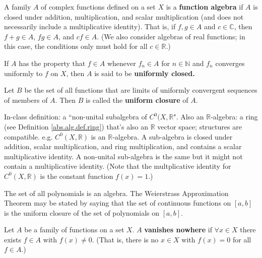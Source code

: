 \begin{definition}

A family \(A\) of complex functions defined on a set \(X\) is a \textbf{function algebra} if \(A\) is closed under addition, multiplication, and scalar multiplication (and does not necessarily include a multiplicative identity). That is, if \(f, g \in A\) and \(c \in \mathbb{C}\), then \(f + g \in A\), \(fg \in A\), and \(cf \in A\). (We also consider algebras of real functions; in this case, the conditions only must hold for all \(c \in \mathbb{R}\).)

If \(A\) has the property that \(f \in A\) whenever \(f_n \in A\) for \(n \in \mathbb{N}\) and \(f_n\) converges uniformly to \(f\) on \(X\), then \(A\) is said to be \textbf{uniformly closed.}

Let \(B\) be the set of all functions that are limits of uniformly convergent sequences of members of \(A\). Then \(B\) is called the \textbf{uniform closure} of \(A\).

In-class definition: a ``non-unital subalgebra of \(C^0(X, \mathbb{R}\)". Also an \(\mathbb{R}\)-algebra: a ring (see Definition \ref{abs.alg.def.ring}) that's also an \(\mathbb{R}\) vector space; structures are compatible. e.g. \(C^0(X, \mathbb{R})\) is an \(\mathbb{R}\)-algebra. A sub-algebra is closed under addition, scalar multiplication, and ring multiplication, and contains a scalar multiplicative identity. A non-unital sub-algebra is the same but it might not contain a multiplicative identity. (Note that the multplicative identity for \(C^0(X, \mathbb{R})\) is the constant function \(f(x) = 1\).)

\end{definition}

\begin{example}

The set of all polynomials is an algebra. The Weierstrass Approximation Theorem may be stated by saying that the set of continuous functions on \([a,b]\) is the uniform closure of the set of polynomials on \([a,b]\).

\end{example}

\begin{definition}

Let \(A\) be a family of functions on a set \(X\). \(A\) \textbf{vanishes nowhere} if \(\forall x \in X\) there exists \( f \in A\) with \(f(x) \neq 0.\) (That is, there is no \(x \in X\) with \(f(x) = 0\) for all \(f \in A\).)

\end{definition}

